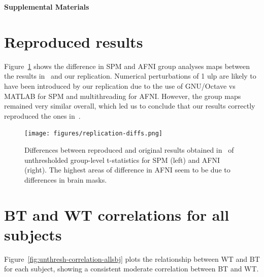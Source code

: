 \documentclass[11pt,onecolumn]{article}
\begin{document}
\setcounter{equation}{0}
\setcounter{figure}{0}
\setcounter{table}{0}
\setcounter{section}{0}

\makeatletter
\renewcommand{\theequation}{S\arabic{equation}}
\renewcommand{\thefigure}{S\arabic{figure}}
\renewcommand{\thesection}{S\arabic{section}}

\textbf{\centering \Large Supplemental Materials}

\section{Reproduced results}
\label{sec:supp-repro}

Figure~\ref{fig:replication-diff} shows the difference in SPM and AFNI
group analyses maps between the results in~\cite{bowring2019exploring} and
our replication. Numerical perturbations of 1 ulp are likely to have been
introduced by our replication due to the use of GNU/Octave vs MATLAB for SPM
and multithreading for AFNI.
  However, the group maps remained very similar
overall, which led us to conclude that our results correctly reproduced
the ones in~\cite{bowring2019exploring}.
\begin{figure}[ht]
  \texttt{[image: figures/replication-diffs.png]}
  \caption{Differences between reproduced and original results obtained in~\cite{bowring2019exploring}
    of unthresholded group-level t-statistics for SPM (left) and AFNI
    (right). The highest areas of difference in AFNI seem to be due to
    differences in brain masks.}
  \label{fig:replication-diff}
\end{figure}

\section{BT and WT correlations for all subjects}
\label{sec:supp-subjects}

Figure~\ref{fig:unthresh-correlation-allsbj} plots the relationship between
WT and BT for each subject, showing a consistent moderate correlation between BT and
WT.
\end{document}
